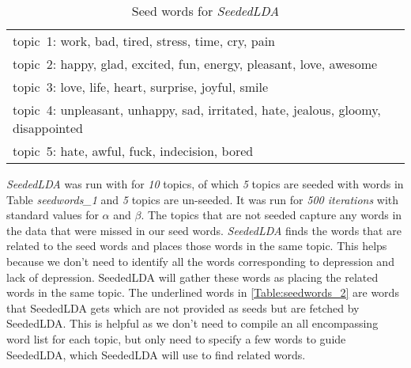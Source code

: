 \begin{table*} [ht!]
	\begin{tabular}{ l }
	\hline
{topic~1: work, bad, tired, stress, time, cry, pain}\\
{topic~2: happy, glad, excited, fun, energy, pleasant, love, awesome}\\
{topic~3: love, life, heart, surprise, joyful, smile}\\
{topic~4: unpleasant, unhappy, sad, irritated, hate, jealous, gloomy, disappointed }\\
{topic~5: hate, awful, fuck, indecision, bored}\\
\hline
    \end{tabular}
      \caption{\noindent Seed words for \textit{SeededLDA}}
        \label{table:seedwords_1}
\end{table*}

\textit{SeededLDA} was run with for \textit{10} topics, of which \textit{5} topics are seeded with words in Table \textit{seedwords\_1} and \textit{5} topics are un-seeded. It was run for \textit{500 iterations} with standard values for $\alpha$ and $\beta$. The topics that are not seeded capture any words in the data that were missed in our seed words. \textit{SeededLDA} finds the words that are related to the seed words and places those words in the same topic. This helps because we don't need to identify all the words corresponding to depression and lack of depression. SeededLDA will gather these words as placing the related words in the same topic. The underlined words in \ref{Table:seedwords_2} are words that SeededLDA gets which are not provided as seeds but are fetched by SeededLDA. This is helpful as we don't need to compile an all encompassing word list for each topic, but only need to specify a few words to guide SeededLDA, which SeededLDA will use to find related words.


